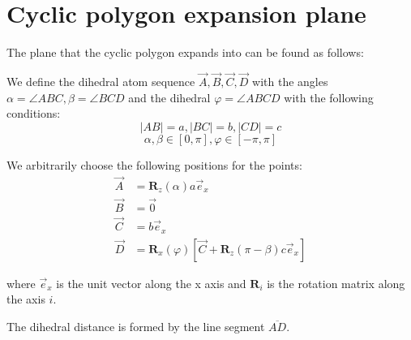 \documentclass[a4paper]{article}
\begin{document}
\newcommand{\volumeCalculationSub}[4]
{\posVecDiff{#1}{#4}^{T}
  \cdot \left[
    \posVecDiff{#2}{#4}
    \times\posVecDiff{#3}{#4}
  \right]
}

\newcommand{\volumeCalculation}[4]
{\left(\vec{#1}-\vec{#4} \right)^{T}
  \cdot \left[
    \left(\vec{#2}-\vec{#4} \right)
    \times\left(\vec{#3}-\vec{#4} \right)
  \right]
}

\newcommand{\partialPosVec}[1]
{\frac{\partial}{\partial\vec{r}_{#1}}}

\newcommand{\partialVec}[1]
{\frac{\partial}{\partial\vec{#1}\,}}

\newcommand{\errf}{\textrm{errf}\posDependence}

\section{Cyclic polygon expansion plane}

The plane that the cyclic polygon expands into can be found as follows:

We define the dihedral atom sequence $\vec{A}, \vec{B}, \vec{C}, \vec{D}$ with 
the angles $\alpha = \angle ABC, \beta = \angle BCD$ and the dihedral 
$\varphi = \angle ABCD$ with the following conditions:
\begin{equation*}
  \left|AB\right| = a, \left|BC\right| = b, \left|CD\right| = c
\end{equation*}
\begin{equation*}
\alpha,\beta \in \left[0, \pi\right], \varphi \in \left[-\pi, \pi\right]
\end{equation*}

We arbitrarily choose the following positions for the points:
\begin{align}
  \vec{A} &= \mathbf{R}_{z}(\alpha) a \vec{e}_x\\
  \vec{B} &= \vec{0}\\
  \vec{C} &= b \vec{e}_x\\
  \vec{D} &= \mathbf{R}_{x}(\varphi)\left[\vec{C} + \mathbf{R}_z(\pi - \beta)c\vec{e}_x\right]
\end{align}

where $\vec{e}_x$ is the unit vector along the x axis and $\mathbf{R}_i$ is the
rotation matrix along the axis $i$.

The dihedral distance is formed by the line segment $\overline{AD}$.
\end{document}
